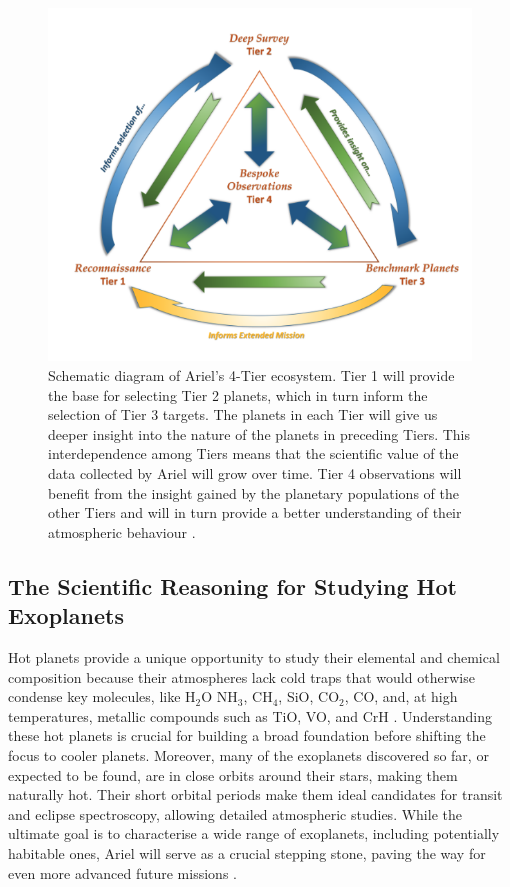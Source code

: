 \documentclass[12pt]{article}
\begin{document}
\begin{figure}
    \centering
    \includegraphics[width=.55\textwidth]{tiers ariel.png}
    \caption{Schematic diagram of Ariel's 4-Tier ecosystem. Tier 1 will provide the base for selecting Tier 2 planets, which in turn inform the selection of Tier 3 targets. The planets in each Tier will give us deeper insight into the nature of the planets in preceding Tiers. This interdependence among Tiers means that the
    scientific value of the data collected by Ariel will grow over time. Tier 4 observations will benefit from the insight gained by the planetary populations of the other Tiers and will in turn provide a better understanding of their atmospheric behaviour \protect\cite[p.40]{arielstudyreport}.}
    \label{fig:5}
\end{figure}

\subsection{The Scientific Reasoning for Studying Hot Exoplanets}

Hot planets provide a unique opportunity to study their elemental and chemical composition because their atmospheres lack cold traps that would otherwise condense key molecules, like H$_2$O NH$_3$, CH$_4$, SiO, CO$_2$, CO, and, at high temperatures, metallic compounds such as TiO, VO, and CrH \cite{ARIEL_M4_Proposal} \cite[p.135]{tinetti2018chemical}.
Understanding these hot planets is crucial for building a broad foundation before shifting the focus to cooler planets. Moreover, many of the exoplanets discovered so far, or expected to be found, are in close orbits around their stars, making them naturally hot. Their short orbital periods make them ideal candidates for transit and eclipse spectroscopy, allowing detailed
atmospheric studies. While the ultimate goal is to characterise a wide range of exoplanets, including potentially habitable ones, Ariel will serve as a crucial stepping stone, paving the way for even more advanced future missions \cite{ARIEL_M4_Proposal}.
\end{document}
